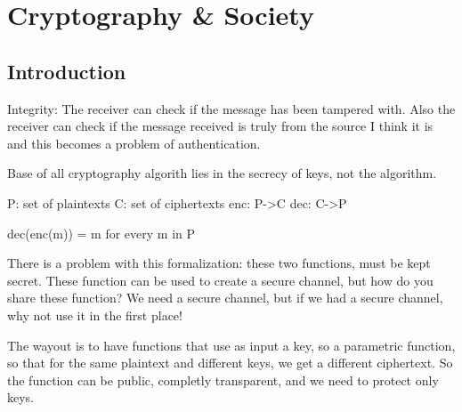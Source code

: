 \chapter{Cryptography & Society}

\section{Introduction}

Integrity: The receiver can check if the message has been tampered with. Also the receiver can check if the message received is truly from the source I think it is and this becomes a problem of authentication.



Base of all cryptography algorith lies in the secrecy of keys, not the algorithm.

P: set of plaintexts
C: set of ciphertexts
enc: P->C
dec: C->P

dec(enc(m)) = m for every m in P

There is a problem with this formalization: these two functions, must be kept secret. These function can be used to create a secure channel, but how do you share these function? We need a secure channel, but if we had a secure channel, why not use it in the first place!

The wayout is to have functions that use as input a key, so a parametric function, so that for the same plaintext and different keys, we get a different ciphertext. So the function can be public, completly transparent, and we need to protect only keys.







